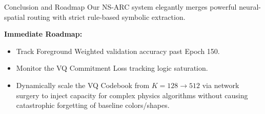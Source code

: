 \documentclass[aspectratio=169, 10pt]{beamer}
\begin{document}
\begin{frame}{Conclusion and Roadmap}
    Our NS-ARC system elegantly merges powerful neural-spatial routing with strict rule-based symbolic extraction. 
    
    \vspace{0.3cm}
    \textbf{Immediate Roadmap:}
    \begin{itemize}
        \item Track Foreground Weighted validation accuracy past Epoch 150.
        \item Monitor the VQ Commitment Loss tracking logic saturation. 
        \item Dynamically scale the VQ Codebook from $K=128 \rightarrow 512$ via network surgery to inject capacity for complex physics algorithms without causing catastrophic forgetting of baseline colors/shapes.
    \end{itemize}
\end{frame}
\end{document}
